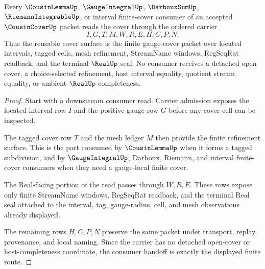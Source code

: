 \begin{theorem}
\label{thm:cousin-cover-gauge-refinement-handoff}
Every $\CousinLemmaUp$, $\GaugeIntegralUp$, $\DarbouxSumUp$, $\RiemannIntegrableUp$, or interval finite-cover consumer of an accepted $\CousinCoverUp$ packet reads the cover through the ordered carrier
$$
I,G,T,M,W,R,E,H,C,P,N .
$$
Thus the reusable cover surface is the finite gauge-cover packet over located intervals, tagged cells, mesh refinement, StreamName windows, RegSeqRat readback, and the terminal $\RealUp$ seal. No consumer receives a detached open cover, a choice-selected refinement, host interval equality, quotient stream equality, or ambient $\RealUp$ completeness.
\end{theorem}
\begin{proof}
Start with a downstream consumer read. Carrier admission exposes the located interval row $I$ and the positive gauge row $G$ before any cover cell can be inspected.

The tagged cover row $T$ and the mesh ledger $M$ then provide the finite refinement surface. This is the part consumed by $\CousinLemmaUp$ when it forms a tagged subdivision, and by $\GaugeIntegralUp$, Darboux, Riemann, and interval finite-cover consumers when they need a gauge-local finite cover.

The Real-facing portion of the read passes through $W,R,E$. These rows expose only finite StreamName windows, RegSeqRat readback, and the terminal Real seal attached to the interval, tag, gauge-radius, cell, and mesh observations already displayed.

The remaining rows $H,C,P,N$ preserve the same packet under transport, replay, provenance, and local naming. Since the carrier has no detached open-cover or host-completeness coordinate, the consumer handoff is exactly the displayed finite route.
\end{proof}


